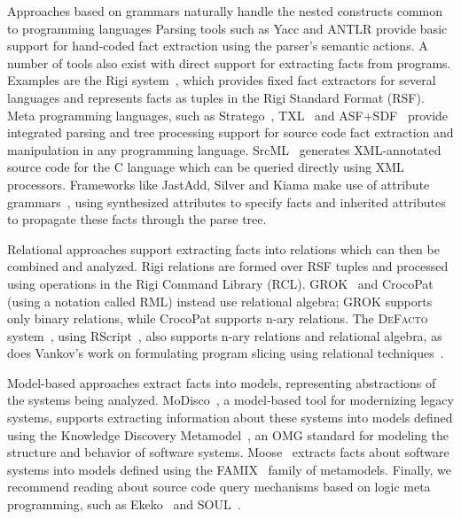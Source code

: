 \documentclass[conference]{IEEEtran}
\newcommand{\Rascal}{\textsc{Rascal}}
\newcommand{\DeFacto}{\textsc{DeFacto}\xspace}
\begin{document}
Approaches based on grammars naturally handle the nested constructs common to
programming languages
Parsing tools such as Yacc and ANTLR provide basic support for hand-coded
fact extraction using the parser's semantic actions. A number of tools also
exist with direct support for extracting facts from programs. Examples are
the Rigi system~\cite{Mueller88}, which provides fixed fact extractors for
several languages and represents facts as tuples in the Rigi Standard Format
(RSF). Meta programming languages, such as Stratego~\cite{BKVV06}, TXL~\cite{TXL06} and ASF+SDF~\cite{BDHJJKKMOSVVV01} provide integrated parsing and tree processing support for source code fact extraction and manipulation in any programming language. SrcML~\cite{srcml} generates XML-annotated source code for the C language which can be queried directly using XML processors. 
Frameworks like JastAdd, Silver and Kiama make use of attribute
grammars~\cite{FNC2,Paakki95,EkmanHedin07,kiama,DBLP:journals/scp/WykBGK10},
using synthesized attributes to specify facts and inherited attributes to
propagate these facts through the parse tree.

Relational approaches support extracting facts into relations which can then
be combined and analyzed. Rigi relations are formed over RSF tuples and
processed using operations in the Rigi Command Library (RCL).
GROK~\cite{Holt96} and CrocoPat~\cite{BeyerEtAl03} (using a
notation called RML) instead use relational algebra; GROK supports only binary
relations, while CrocoPat supports n-ary relations. The \DeFacto
system~\cite{DBLP:conf/sle/BastenK08}, using RScript~\cite{KlintRscript}, also
supports n-ary relations and relational algebra, as does Vankov's work on
formulating program slicing using relational techniques~\cite{Vankov05}.

Model-based approaches extract facts into models, representing abstractions of
the systems being analyzed. MoDisco~\cite{DBLP:journals/infsof/BruneliereCDM14,DBLP:conf/kbse/BruneliereCJM10},
a model-based tool for modernizing legacy
systems, supports extracting information about these systems into models
defined using the Knowledge Discovery Metamodel~\cite{omg-kdm}, an OMG
standard for modeling the structure and behavior of software systems. 
Moose~\cite{DBLP:conf/sigsoft/NierstraszDG05,DBLP:journals/sigsoft/Nierstrasz12}
extracts facts about software systems into models defined using the FAMIX~\cite{famix}
family of metamodels. Finally, we recommend reading about source code query mechanisms based on logic meta programming, such as Ekeko~\cite{ekeko} and SOUL~\cite{soul}.
\end{document}
